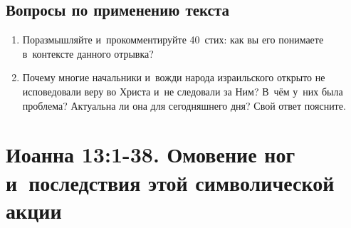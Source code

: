 \documentclass[a4paper,12pt]{article}
\begin{document}
\subsection*{Вопросы по применению текста} 
\begin{enumerate}
    \item Поразмышляйте и~прокомментируйте 40~стих: как вы его понимаете в~контексте данного отрывка? 
    
    \myline
    
    \myline
    \item Почему многие начальники и~вожди народа израильского открыто не исповедовали веру во Христа и~не следовали за Ним? В~чём у~них была проблема? Актуальна ли она для сегодняшнего дня? Свой ответ поясните. 
    
    \myline
    
    \myline
\end{enumerate}



\section{Иоанна 13:1-38. Омовение ног и~последствия этой символической акции}
\end{document}
